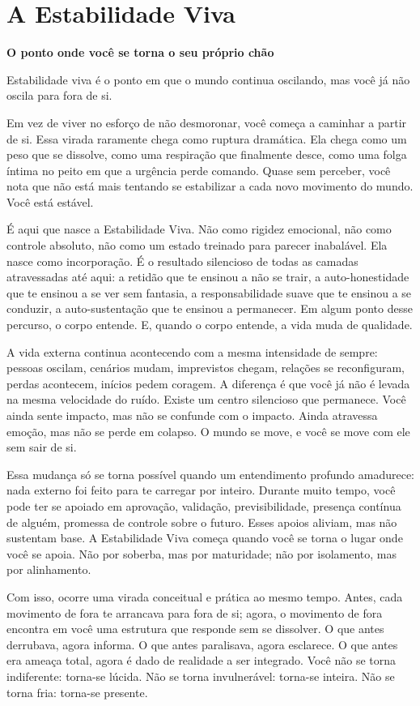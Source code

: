 \documentclass[12pt]{book}
\begin{document}
\chapter{A Estabilidade Viva}

\textbf{O ponto onde você se torna o seu próprio chão}

Estabilidade viva é o ponto em que o mundo continua oscilando, mas você já não oscila para fora de si.

Em vez de viver no esforço de não desmoronar, você começa a caminhar a partir de si. Essa virada raramente chega como ruptura dramática. Ela chega como um peso que se dissolve, como uma respiração que finalmente desce, como uma folga íntima no peito em que a urgência perde comando. Quase sem perceber, você nota que não está mais tentando se estabilizar a cada novo movimento do mundo. Você está estável.

É aqui que nasce a Estabilidade Viva. Não como rigidez emocional, não como controle absoluto, não como um estado treinado para parecer inabalável. Ela nasce como incorporação. É o resultado silencioso de todas as camadas atravessadas até aqui: a retidão que te ensinou a não se trair, a auto-honestidade que te ensinou a se ver sem fantasia, a responsabilidade suave que te ensinou a se conduzir, a auto-sustentação que te ensinou a permanecer. Em algum ponto desse percurso, o corpo entende. E, quando o corpo entende, a vida muda de qualidade.

A vida externa continua acontecendo com a mesma intensidade de sempre: pessoas oscilam, cenários mudam, imprevistos chegam, relações se reconfiguram, perdas acontecem, inícios pedem coragem. A diferença é que você já não é levada na mesma velocidade do ruído. Existe um centro silencioso que permanece. Você ainda sente impacto, mas não se confunde com o impacto. Ainda atravessa emoção, mas não se perde em colapso. O mundo se move, e você se move com ele sem sair de si.

Essa mudança só se torna possível quando um entendimento profundo amadurece: nada externo foi feito para te carregar por inteiro. Durante muito tempo, você pode ter se apoiado em aprovação, validação, previsibilidade, presença contínua de alguém, promessa de controle sobre o futuro. Esses apoios aliviam, mas não sustentam base. A Estabilidade Viva começa quando você se torna o lugar onde você se apoia. Não por soberba, mas por maturidade; não por isolamento, mas por alinhamento.

Com isso, ocorre uma virada conceitual e prática ao mesmo tempo. Antes, cada movimento de fora te arrancava para fora de si; agora, o movimento de fora encontra em você uma estrutura que responde sem se dissolver. O que antes derrubava, agora informa. O que antes paralisava, agora esclarece. O que antes era ameaça total, agora é dado de realidade a ser integrado. Você não se torna indiferente: torna-se lúcida. Não se torna invulnerável: torna-se inteira. Não se torna fria: torna-se presente.
\end{document}
